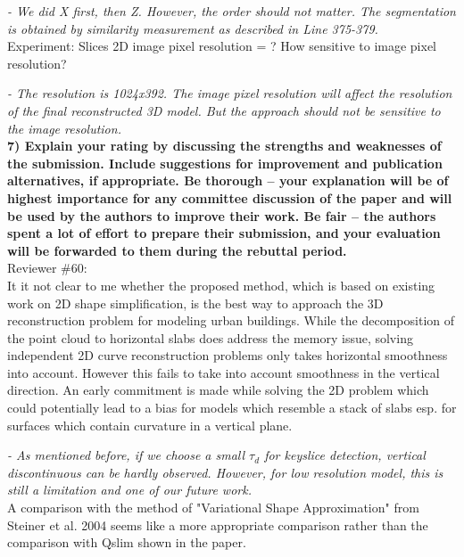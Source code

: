 \documentclass[12pt,letterpaper]{article}
\begin{document}
{\it- We did X first, then Z. However, the order should not matter. The segmentation
is obtained by similarity measurement as described in Line 375-379.}\\


Experiment: Slices 2D image pixel resolution = ? How sensitive to image pixel
resolution? 

{\it- The resolution is 1024x392. The image pixel resolution will affect the resolution
of the final reconstructed 3D model. But the approach should not be sensitive to 
the image resolution.}\\


\textbf{ 7) Explain your rating by discussing the strengths and weaknesses of the submission. Include suggestions for improvement and publication
alternatives, if appropriate. Be thorough -- your explanation will be of highest importance for any committee discussion of the paper and will be used by
the authors to improve their work. Be fair -- the authors spent a lot of effort to prepare their submission, and your evaluation will be forwarded to them
during the rebuttal period.} \\

Reviewer \#60:\\

It it not clear to me whether the proposed method, which is based on existing work on
2D shape simplification, is the best way to approach the 3D reconstruction problem for
modeling urban buildings. While the decomposition of the point cloud to horizontal
slabs does address the memory issue, solving independent 2D curve reconstruction
problems only takes horizontal smoothness into account. However this fails to take
into account smoothness in the vertical direction. An early commitment is made while
solving the 2D problem which could potentially lead to a bias for models which
resemble a stack of slabs esp. for surfaces which contain curvature in a vertical
plane.

{\it- As mentioned before, if we choose a small $\tau_d$ for keyslice detection, 
vertical discontinuous can be hardly observed. However, for low resolution model,
this is still a limitation and one of our future work. } \\

A comparison with the method of "Variational Shape Approximation" from Steiner et al.
2004 seems like a more appropriate comparison rather than the comparison with Qslim
shown in the paper.
\end{document}
